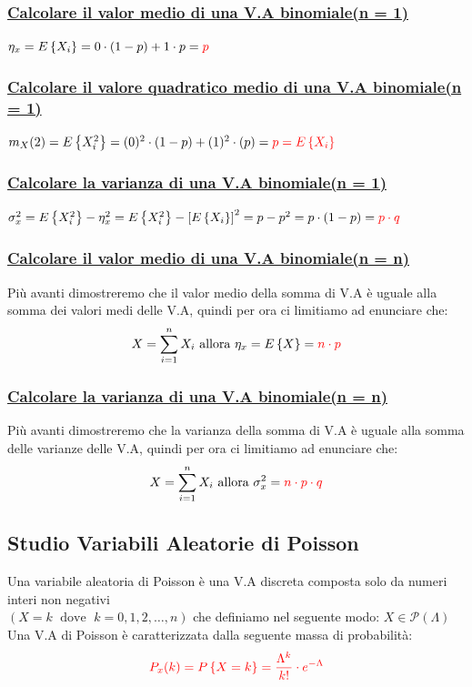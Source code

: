 \documentclass{article}
\begin{document}
\subsubsection{\underline{Calcolare il valor medio di una V.A binomiale(n = 1)}}
$\eta_x = E \left\{ X_i \right\} = 0 \cdot (1-p) + 1 \cdot p = \color{red}p$
\subsubsection{\underline{Calcolare il valore quadratico medio di una V.A binomiale(n = 1)}}
$m_X(2) = E \left\{ X_i^2 \right\} = (0)^2 \cdot (1-p) + (1)^2 \cdot (p) = \color{red}p = E\left\{X_i\right\}$
\subsubsection{\underline{Calcolare la varianza di una V.A binomiale(n = 1)}}
$\sigma_x^2 = E\left\{ X_i^2 \right\} - \eta_x^2 = E\left\{ X_i^2 \right\} - \left[ E\left\{ X_i \right\}\right]^2 = p-p^2 = p\cdot (1-p) = \color{red} p \cdot q$
\subsubsection{\underline{Calcolare il valor medio di una V.A binomiale(n = n)}}
Più avanti dimostreremo che il valor medio della somma di V.A è uguale alla somma dei valori medi delle V.A, quindi per ora ci limitiamo ad enunciare che:
\[X = \sum_{i=1}^{n} X_i \text{ allora } \eta_x = E\left\{X\right\} = \color{red} n \cdot p\]
\subsubsection{\underline{Calcolare la varianza di una V.A binomiale(n = n)}}
Più avanti dimostreremo che la varianza della somma di V.A è uguale alla somma delle varianze delle V.A, quindi per ora ci limitiamo ad enunciare che:
\[X = \sum_{i=1}^{n} X_i \text{ allora } \sigma^2_x = \color{red} n \cdot p \cdot q\]

\subsection{Studio Variabili Aleatorie di Poisson}
Una variabile aleatoria di Poisson è una V.A discreta composta solo da numeri interi non negativi \\ $\left(X = k \;\text{ dove }\; k=0,1,2,\dots,n\right)$ che definiamo nel seguente modo: $X \in \mathcal{P}(\Lambda)$ \\
Una V.A di Poisson è caratterizzata dalla seguente massa di probabilità:
\[\color{red} P_x(k) = P \left\{X = k\right\} = \frac{\Lambda^k}{k!} \cdot e^{-\Lambda}\]
\end{document}
